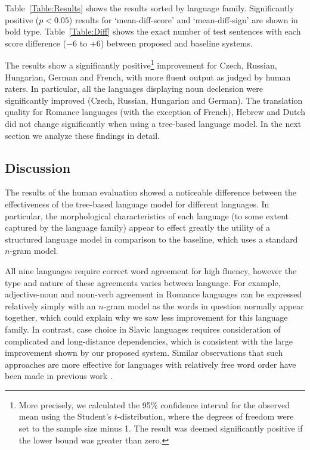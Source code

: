 \documentclass[english]{jnlp_1.4}
\begin{document}
Table~\ref{Table:Results} shows the results sorted by language family.
Significantly positive ($p < 0.05$) results for `mean-diff-score' and `mean-diff-sign'
are shown in bold type. Table~\ref{Table:Diff} shows the exact number of test sentences
with each score difference ($-6$ to +6) between proposed and baseline systems.

The results show a significantly positive\footnote{More precisely,
we calculated the 95\% confidence interval for the observed mean using the Student's
$t$-distribution, where the degrees of freedom were set to the sample size minus 1.
The result was deemed significantly positive if the lower bound was greater than zero.}
improvement for Czech, Russian, Hungarian,
German and French, with more fluent output as judged by human raters.
In particular,
all the languages displaying noun declension were significantly improved (Czech, Russian, Hungarian
and German). The translation quality for Romance languages (with the exception of French),
Hebrew and Dutch did not change significantly when using a tree-based language model.
In the next section we analyze these findings in detail.


\subsection{Discussion}

The results of the human evaluation showed a
noticeable difference between the effectiveness of the tree-based language model
for different languages.
In particular, the morphological characteristics of each language (to some extent captured by
the language family) appear to effect greatly the utility of a structured language model
in comparison to the baseline, which uses a standard $n$-gram model.

All nine languages require correct word agreement for high fluency, however the type and nature
of these agreements varies between language. For example, adjective-noun and noun-verb
agreement in Romance languages can be expressed relatively simply with an $n$-gram model
as the words in question normally appear together, which could explain why we saw less
improvement for this language family. In contrast,
case choice in Slavic languages requires consideration of complicated and
long-distance dependencies, which is consistent with the large improvement shown by our proposed system.
Similar observations that such approaches are more
effective for languages with relatively free word order have been made in previous work \cite{Sennrich15}.
\end{document}
